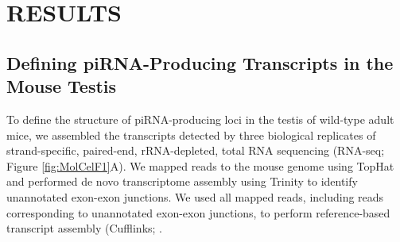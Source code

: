 \section{RESULTS}

  \subsection{Defining piRNA-Producing Transcripts in the Mouse Testis}

    To define the structure of piRNA-producing loci in the testis of wild-type adult mice, we assembled the transcripts detected by three biological replicates of strand-specific, paired-end, rRNA-depleted, total RNA sequencing (RNA-seq; Figure \ref{fig:MolCelF1}A). We mapped reads to the mouse genome using TopHat \citep{Trapnell2009} and performed de novo transcriptome assembly using Trinity \citep{Grabherr2011} to identify unannotated exon-exon junctions. We used all mapped reads, including reads corresponding to unannotated exon-exon junctions, to perform reference-based transcript assembly (Cufflinks; \citep{Trapnell2010}.

